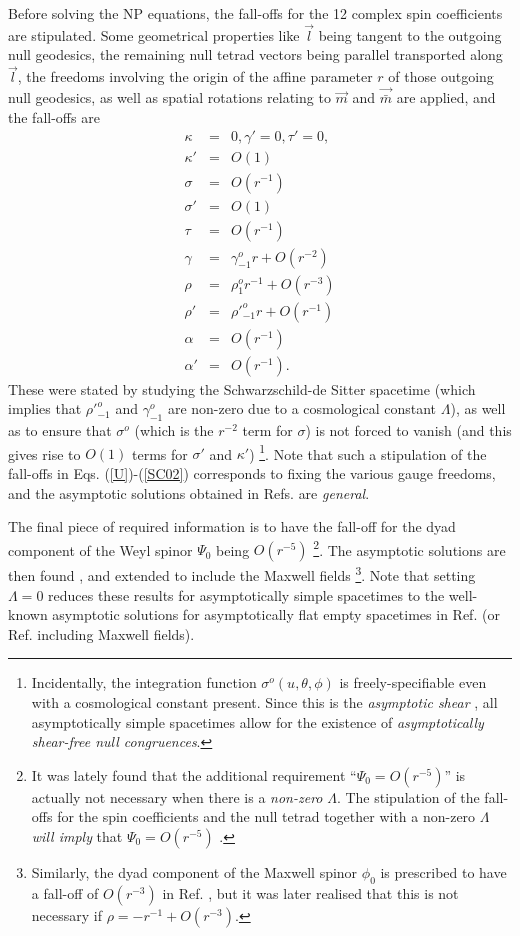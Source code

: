 \documentclass[aps,pre,preprint,superscriptaddress,showpacs,showkeys]{revtex4-1}
\begin{document}
Before solving the NP equations, the fall-offs for the 12 complex spin coefficients are stipulated. Some geometrical properties like $\vec{l}$ being tangent to the outgoing null geodesics, the remaining null tetrad vectors being parallel transported along $\vec{l}$, the freedoms involving the origin of the affine parameter $r$ of those outgoing null geodesics, as well as spatial rotations relating to $\vec{m}$ and $\vec{\bar{m}}$ are applied, and the fall-offs are
\begin{eqnarray}\label{SC01}
\kappa&=&0, \gamma'=0, \tau'=0,\\
\kappa'&=&O(1)\\
\sigma&=&O(r^{-1})\\
\sigma'&=&O(1)\\
\tau&=&O(r^{-1})\\
\gamma&=&\gamma^o_{-1}r+O(r^{-2})\\
\rho&=&\rho^o_1r^{-1}+O(r^{-3})\\
\rho'&=&\rho'^o_{-1}r+O(r^{-1})\\
\alpha&=&O(r^{-1})\\
\alpha'&=&O(r^{-1}).\label{SC02}
\end{eqnarray}
These were stated by studying the Schwarzschild-de Sitter spacetime (which implies that $\rho'^o_{-1}$ and $\gamma^o_{-1}$ are non-zero due to a cosmological constant $\Lambda$), as well as to ensure that $\sigma^o$ (which is the $r^{-2}$ term for $\sigma$) is not forced to vanish (and this gives rise to $O(1)$ terms for $\sigma'$ and $\kappa'$) \footnote{Incidentally, the integration function $\sigma^o(u,\theta,\phi)$ is freely-specifiable even with a cosmological constant present. Since this is the \emph{asymptotic shear} \cite{ANK}, all asymptotically simple spacetimes allow for the existence of \emph{asymptotically shear-free null congruences}.}. Note that such a stipulation of the fall-offs in Eqs. (\ref{U})-(\ref{SC02}) corresponds to fixing the various gauge freedoms, and the asymptotic solutions obtained in Refs. \cite{Vee2016,Vee2017} are \emph{general}.

The final piece of required information is to have the fall-off for the dyad component of the Weyl spinor $\Psi_0$ being $O(r^{-5})$ \footnote{It was lately found that the additional requirement ``$\Psi_0=O(r^{-5})$'' is actually not necessary when there is a \emph{non-zero} $\Lambda$. The stipulation of the fall-offs for the spin coefficients and the null tetrad together with a non-zero $\Lambda$ \emph{will imply} that $\Psi_0=O(r^{-5})$ \cite{Vee2017c}.}. The asymptotic solutions are then found \cite{Vee2016}, and extended to include the Maxwell fields \cite{Vee2017} \footnote{Similarly, the dyad component of the Maxwell spinor $\phi_0$ is prescribed to have a fall-off of $O(r^{-3})$ in Ref. \cite{Vee2017}, but it was later realised that this is not necessary if $\rho=-r^{-1}+O(r^{-3})$.}. Note that setting $\Lambda=0$ reduces these results for asymptotically simple spacetimes to the well-known asymptotic solutions for asymptotically flat empty spacetimes in Ref. \cite{newunti62} (or Ref. \cite{Pen88} including Maxwell fields).
\end{document}
